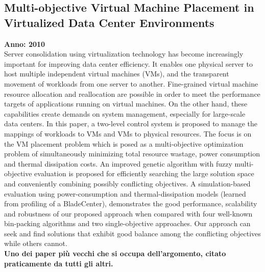 \subsection{Multi-objective Virtual Machine Placement in Virtualized Data Center Environments}
\textbf{Anno: 2010}~\cite{xu2010multi}\\
Server consolidation using virtualization technology
has become increasingly important for improving data center
efficiency. It enables one physical server to host multiple
independent virtual machines (VMs), and the transparent
movement of workloads from one server to another. Fine-grained
virtual machine resource allocation and reallocation are possible
in order to meet the performance targets of applications running
on virtual machines. On the other hand, these capabilities create
demands on system management, especially for large-scale data
centers. In this paper, a two-level control system is proposed to
manage the mappings of workloads to VMs and VMs to physical
resources. The focus is on the VM placement problem which is
posed as a multi-objective optimization problem of
simultaneously minimizing total resource wastage, power
consumption and thermal dissipation costs. An improved genetic
algorithm with fuzzy multi-objective evaluation is proposed for
efficiently searching the large solution space and conveniently
combining possibly conflicting objectives. A simulation-based
evaluation using power-consumption and thermal-dissipation
models (learned from profiling of a BladeCenter), demonstrates
the good performance, scalability and robustness of our proposed
approach when compared with four well-known bin-packing
algorithms and two single-objective approaches. Our approach
can seek and find solutions that exhibit good balance among the
conflicting objectives while others cannot. \\

\textbf{Uno dei paper più vecchi che si occupa dell'argomento, citato praticamente da tutti gli altri.}

